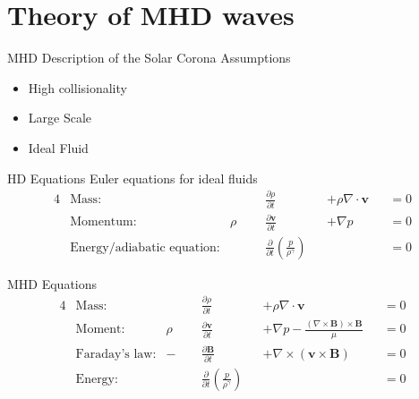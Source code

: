 \documentclass{beamer}
\begin{document}
\section{Theory of MHD waves}
\begin{frame}{MHD Description of the Solar Corona}
    \centering
    Assumptions
    \begin{itemize}
        \item High collisionality
        \item Large Scale
        \item Ideal Fluid
    \end{itemize}
\end{frame}
\begin{frame}{HD Equations}
Euler equations for ideal fluids
\begin{alignat*}{4}
	&\text{Mass:} &\quad\quad &\frac{\partial \rho}{\partial t} & &+ \rho \nabla \cdot \mathbf v & &=  0 \\
	&\text{Momentum:} & \rho& \frac{\partial \mathbf v}{\partial t} & &+ \nabla p & &= 0\\
	&\text{Energy/adiabatic equation:} & &\frac{\partial }{\partial t} \left( \frac{p}{\rho^{\gamma}} \right)  & & & &= 0
\end{alignat*}
\end{frame}
\begin{frame}{MHD Equations}
    \begin{alignat*}{4}
	&\text{Mass:} &\quad\quad &\frac{\partial \rho}{\partial t} & & +\rho \nabla \cdot \mathbf v& &= 0 \\ 	
	&\text{Moment:} & \rho& \frac{\partial \mathbf v}{\partial t} & &+ \nabla p - \frac{(\nabla \times \mathbf B) \times \mathbf B}{\mu}& &=  0  \\
	&\text{Faraday's law:} & -&\frac{\partial \mathbf B}{\partial t} & &+ \nabla \times (\mathbf v \times \mathbf B)& &= 0 \\
	&\text{Energy:} & &\frac{\partial }{\partial t} \left( \frac{p}{\rho^{\gamma}} \right)  & & & &= 0 
\end{alignat*}

\end{frame}
\end{document}

